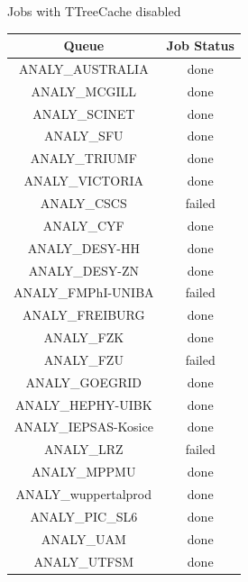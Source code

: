 Jobs with TTreeCache disabled 

\begin{longtable}{|c|c|}

	\hline

	Queue & Job Status\\\hline
	\endhead

	\hline
	\color{black}ANALY\_AUSTRALIA & \color{green}done \\
	\hline
	\color{black}ANALY\_MCGILL & \color{green}done \\
	\hline
	\color{black}ANALY\_SCINET & \color{green}done \\
	\hline
	\color{black}ANALY\_SFU & \color{green}done \\
	\hline
	\color{black}ANALY\_TRIUMF & \color{green}done \\
	\hline
	\color{black}ANALY\_VICTORIA & \color{green}done \\
	\hline
	\color{black}ANALY\_CSCS & \color{red}failed \\
	\hline
	\color{black}ANALY\_CYF & \color{green}done \\
	\hline
	\color{black}ANALY\_DESY-HH & \color{green}done \\
	\hline
	\color{black}ANALY\_DESY-ZN & \color{green}done \\
	\hline
	\color{black}ANALY\_FMPhI-UNIBA & \color{red}failed \\
	\hline
	\color{black}ANALY\_FREIBURG & \color{green}done \\
	\hline
	\color{black}ANALY\_FZK & \color{green}done \\
	\hline
	\color{black}ANALY\_FZU & \color{red}failed \\
	\hline
	\color{black}ANALY\_GOEGRID & \color{green}done \\
	\hline
	\color{black}ANALY\_HEPHY-UIBK & \color{green}done \\
	\hline
	\color{black}ANALY\_IEPSAS-Kosice & \color{green}done \\
	\hline
	\color{black}ANALY\_LRZ & \color{red}failed \\
	\hline
	\color{black}ANALY\_MPPMU & \color{green}done \\
	\hline
	\hline
	\color{black}ANALY\_wuppertalprod & \color{green}done \\
	\hline
	\color{black}ANALY\_PIC\_SL6 & \color{green}done \\
	\hline
	\color{black}ANALY\_UAM & \color{green}done \\
	\hline
	\color{black}ANALY\_UTFSM & \color{green}done \\

\end{longtable}
